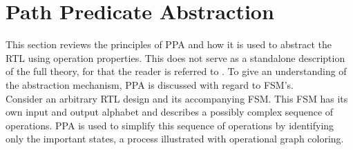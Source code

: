 \section{Path Predicate Abstraction}
\label{sec:ppa}

This section reviews the principles of PPA and how it is used to abstract the RTL using operation properties. This does not serve as a standalone description of the full theory, for that the reader is referred to \cite{2014-UrdahlStoffel.etal}. To give an understanding of the abstraction mechanism, PPA is discussed with regard to FSM's. \\
Consider an arbitrary RTL design and its accompanying FSM. This FSM has its own input and output alphabet and describes a possibly complex sequence of operations. PPA is used to simplify this sequence of operations by identifying only the important states, a process illustrated with operational graph coloring. \\ 

